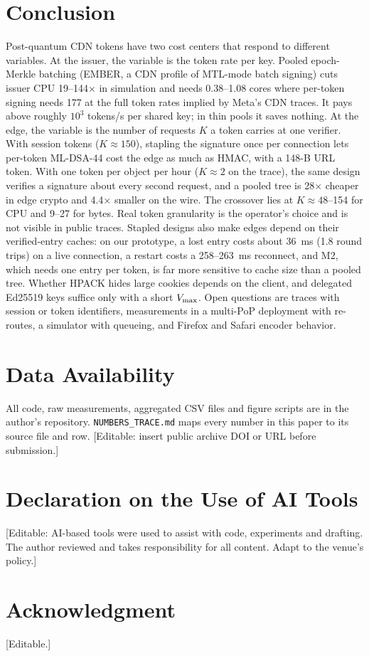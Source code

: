 \section{Conclusion}
\label{sec:conclusion}
Post-quantum CDN tokens have two cost centers that respond to different variables. At the issuer, the variable is the token rate per key. Pooled epoch-Merkle batching (EMBER, a CDN profile of MTL-mode batch signing) cuts issuer CPU 19--144$\times$ in simulation and needs 0.38--1.08 cores where per-token signing needs 177 at the full token rates implied by Meta's CDN traces. It pays above roughly $10^3$ tokens/s per shared key; in thin pools it saves nothing. At the edge, the variable is the number of requests $K$ a token carries at one verifier. With session tokens ($K\approx150$), stapling the signature once per connection lets per-token ML-DSA-44 cost the edge as much as HMAC, with a 148-B URL token. With one token per object per hour ($K\approx2$ on the trace), the same design verifies a signature about every second request, and a pooled tree is 28$\times$ cheaper in edge crypto and 4.4$\times$ smaller on the wire. The crossover lies at $K\approx48$--154 for CPU and 9--27 for bytes. Real token granularity is the operator's choice and is not visible in public traces. Stapled designs also make edges depend on their verified-entry caches: on our prototype, a lost entry costs about 36~ms (1.8 round trips) on a live connection, a restart costs a 258--263~ms reconnect, and M2, which needs one entry per token, is far more sensitive to cache size than a pooled tree. Whether HPACK hides large cookies depends on the client, and delegated Ed25519 keys suffice only with a short $V_{\max}$. Open questions are traces with session or token identifiers, measurements in a multi-PoP deployment with re-routes, a simulator with queueing, and Firefox and Safari encoder behavior.

\section*{Data Availability}
All code, raw measurements, aggregated CSV files and figure scripts are in the author's repository. \texttt{NUMBERS\_TRACE.md} maps every number in this paper to its source file and row. [Editable: insert public archive DOI or URL before submission.]

\section*{Declaration on the Use of AI Tools}
[Editable: AI-based tools were used to assist with code, experiments and drafting. The author reviewed and takes responsibility for all content. Adapt to the venue's policy.]

\section*{Acknowledgment}
[Editable.]
